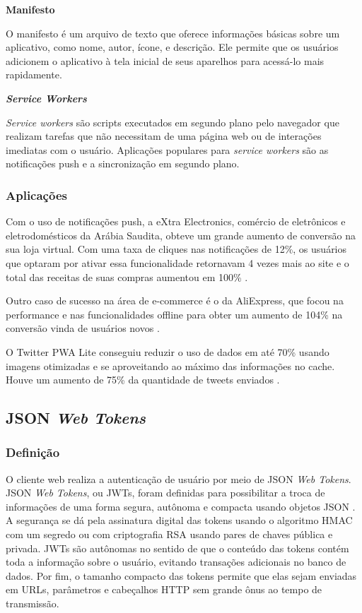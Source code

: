 \begin{description}

\item \textbf{Manifesto}

O manifesto é um arquivo de texto que oferece informações básicas sobre um aplicativo, como nome, autor, ícone, e descrição. Ele permite que os usuários adicionem o aplicativo à tela inicial de seus aparelhos para acessá-lo mais rapidamente.

\item \textbf{\textit{Service Workers}}

\textit{Service workers} são scripts executados em segundo plano pelo navegador que realizam tarefas que não necessitam de uma página web ou de interações imediatas com o usuário. Aplicações populares para \textit{service workers} são as notificações push e a sincronização em segundo plano.

\end{description}

\subsubsection{Aplicações}
Com o uso de notificações push, a eXtra Electronics, comércio de eletrônicos e eletrodomésticos da Arábia Saudita, obteve um grande aumento de conversão na sua loja virtual. Com uma taxa de cliques nas notificações de 12\%, os usuários que optaram por ativar essa funcionalidade retornavam 4 vezes mais ao site e o total das receitas de suas compras aumentou em 100\% \cite{googledevextra}.

Outro caso de sucesso na área de e-commerce é o da AliExpress, que focou na performance e nas funcionalidades offline para obter um aumento de 104\% na conversão vinda de usuários novos \cite{googledevaliexpress}.

O Twitter PWA Lite conseguiu reduzir o uso de dados em até 70\% usando imagens otimizadas e se aproveitando ao máximo das informações no cache. Houve um aumento de 75\% da quantidade de tweets enviados \cite{googledevtwitter}.

\subsection{JSON \textit{Web Tokens} \label{sec:JWT}}

\subsubsection{Definição}
O cliente web realiza a autenticação de usuário por meio de JSON \textit{Web Tokens}. JSON \textit{Web Tokens}, ou JWTs, foram definidas para possibilitar a troca de informações de uma forma segura, autônoma e compacta usando objetos JSON \cite{rfc7519}. A segurança se dá pela assinatura digital das tokens usando o algoritmo HMAC com um segredo ou com criptografia RSA usando pares de chaves pública e privada. JWTs são autônomas no sentido de que o conteúdo das tokens contém toda a informação sobre o usuário, evitando transações adicionais no banco de dados. Por fim, o tamanho compacto das tokens permite que elas sejam enviadas em URLs, parâmetros e cabeçalhos HTTP sem grande ônus ao tempo de transmissão.

